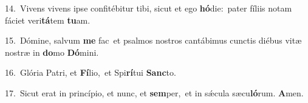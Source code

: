 {\numbfont\textcolor{\numbcolor}{14.}}~Vivens vivens ipse confitébitur tibi, sicut et ego \textbf{hó}\-die:~\star pater fíliis notam fáciet veri\-\textbf{tá}\-tem \textbf{tu}\-am.\par
{\numbfont\textcolor{\numbcolor}{15.}}~Dómine, salvum \textbf{me} fac~\star et psalmos nostros cantábimus cunctis diébus vitæ nostræ in \textbf{do}\-mo \textbf{Dó}\-mini.\par
{\numbfont\textcolor{\numbcolor}{16.}}~Glória Patri, et \textbf{Fí}\-lio,~\star et Spi\-\textbf{rí}\-tui \textbf{Sanc}\-to.\par
{\numbfont\textcolor{\numbcolor}{17.}}~Sicut erat in princípio, et nunc, et \textbf{sem}\-per,~\star et in sǽcula sæcu\-\textbf{ló}\-rum. \textbf{A}\-men.\par
